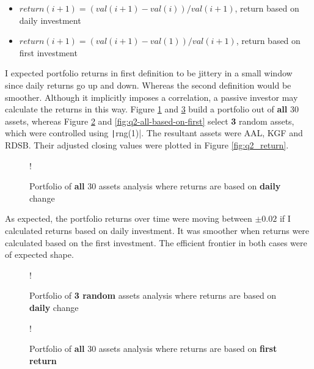 \documentclass[11pt]{article}
\begin{document}
\begin{itemize}
	\item $return(i+1) = (val(i+1) - \mathit{val(i)})/val(i+1)$, return based on daily investment
	\item $return(i+1) = (val(i+1) - \mathit{val(1)})/val(i+1)$, return based on first investment
\end{itemize}

I expected portfolio returns in first definition to be jittery in a small window since daily returns
go up and down. Whereas the second definition would be smoother. Although it implicitly imposes a correlation,
a passive investor may calculate the returns in this way. Figure \ref{fig:q2-all-assets-all-based-on-daily} and
\ref{fig:q2-all-assets-all-based-on-first} build a portfolio out of \textbf{all} 30 assets, whereas
Figure \ref{fig:q2-all-based-on-daily} and \ref{fig:q2-all-based-on-first} select \textbf{3} random assets,
which were controlled using \texttt|rng(1)|. The resultant assets were AAL, KGF and RDSB.
Their adjusted closing values were plotted in Figure \ref{fig:q2_return}.

\begin{figure}[!h]
   \centering 
 	\resizebox {\textwidth} {!} { }
    \caption{Portfolio of \textbf{all} 30 assets analysis where returns are based on \textbf{daily} change}
	\label{fig:q2-all-assets-all-based-on-daily}
	\vspace{-0.3cm}
\end{figure}

As expected, the portfolio returns over time were moving between $\pm0.02$ if I calculated returns
based on daily investment. It was smoother when returns were calculated based on the first investment. The efficient frontier in
both cases were of expected shape.

\begin{figure}[!h]
   \centering 
 	\resizebox {\textwidth} {!} { }
    \caption{Portfolio of \textbf{3 random} assets analysis where returns are based on \textbf{daily} change}
	\label{fig:q2-all-based-on-daily}
	\vspace{-0.3cm}
\end{figure}

\begin{figure}[!h]
   \centering 
 	\resizebox {\textwidth} {!} { }
    \caption{Portfolio of \textbf{all} 30 assets analysis where returns are based on \textbf{first return}}
	\label{fig:q2-all-assets-all-based-on-first}
	\vspace{-0.3cm}
\end{figure}
\end{document}
